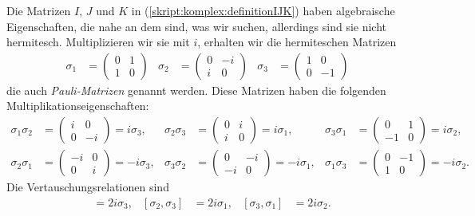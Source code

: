 Die Matrizen $I$, $J$ und $K$ in (\ref{skript:komplex:definitionIJK}) haben
algebraische Eigenschaften, die nahe an dem sind, was wir suchen,
allerdings sind sie nicht hermitesch.
Multiplizieren wir sie mit $i$, erhalten wir die hermiteschen Matrizen
\begin{align}
\sigma_1
&=
\begin{pmatrix}
0&1\\1&0
\end{pmatrix}
&
\sigma_2
&=
\begin{pmatrix}
0&-i\\i&0
\end{pmatrix}
&
\sigma_3
&=
\begin{pmatrix}
1&0\\0&-1
\end{pmatrix}
\label{spin:paulimatrizen}
\end{align}
die auch {\em Pauli-Matrizen} genannt werden.
Diese Matrizen haben die folgenden Multiplikationseigenschaften:
\begin{align*}
\sigma_1\sigma_2
&=
\begin{pmatrix} i&0\\0&-i \end{pmatrix} = i\sigma_3,
&
\sigma_2\sigma_3
&=
\begin{pmatrix} 0&i\\i&0 \end{pmatrix} = i\sigma_1,
&
\sigma_3\sigma_1
&=
\begin{pmatrix} 0&1\\-1&0 \end{pmatrix} = i\sigma_2,
\\
\sigma_2\sigma_1
&=
\begin{pmatrix} -i&0\\0&i \end{pmatrix} = -i\sigma_3,
&
\sigma_3\sigma_2
&=
\begin{pmatrix} 0&-i\\-i&0 \end{pmatrix} = -i\sigma_1,
&
\sigma_1\sigma_3
&=
\begin{pmatrix} 0&-1\\1&0 \end{pmatrix} = -i\sigma_2.
\end{align*}
Die Vertauschungsrelationen sind
\begin{align*}
[\sigma_1,\sigma_2]
&=
2i\sigma_3,
&
[\sigma_2,\sigma_3]
&=
2i\sigma_1,
&
[\sigma_3,\sigma_1]
&=
2i\sigma_2.
\end{align*}
